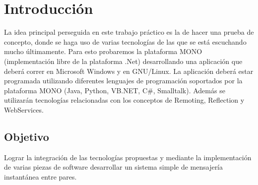 \section{Introducción}
La idea principal perseguida en este trabajo práctico es la de hacer una prueba 
de concepto, donde se haga uso de varias tecnologías de las que se está 
escuchando mucho últimamente.
Para esto probaremos la plataforma MONO (implementación libre de la plataforma 
.Net) desarrollando una aplicación que deberá correr en Microsoft Windows y en 
GNU/Linux. La aplicación deberá estar programada utilizando diferentes 
lenguajes de programación soportados por la plataforma MONO (Java, Python, 
VB.NET, C\#, Smalltalk). Además se utilizarán tecnologías relacionadas con los 
conceptos de Remoting, Reflection y WebServices.

\subsection{Objetivo}
Lograr la integración de las tecnologías propuestas y mediante la 
implementación de varias piezas de software desarrollar un sistema simple de 
mensajería instantánea entre pares.
